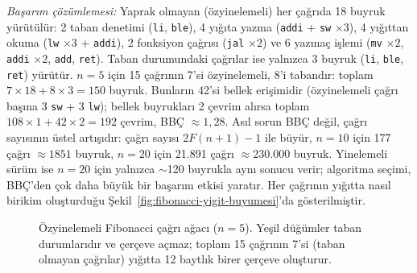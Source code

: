 \begin{ornek}[4.14]
\emph{Başarım çözümlemesi:} Yaprak olmayan (özyinelemeli) her çağrıda 18 buyruk yürütülür: 2 taban denetimi (\texttt{li}, \texttt{ble}), 4 yığıta yazma (\texttt{addi} + \texttt{sw} $\times 3$), 4 yığıttan okuma (\texttt{lw} $\times 3$ + \texttt{addi}), 2 fonksiyon çağrısı (\texttt{jal} $\times 2$) ve 6 yazmaç işlemi (\texttt{mv} $\times 2$, \texttt{addi} $\times 2$, \texttt{add}, \texttt{ret}). Taban durumundaki çağrılar ise yalnızca 3 buyruk (\texttt{li}, \texttt{ble}, \texttt{ret}) yürütür. $n = 5$ için 15 çağrının 7'si özyinelemeli, 8'i tabandır: toplam $7 \times 18 + 8 \times 3 = 150$ buyruk. Bunların 42'si bellek erişimidir (özyinelemeli çağrı başına 3 \texttt{sw} + 3 \texttt{lw}); bellek buyrukları 2 çevrim alırsa toplam $108 \times 1 + 42 \times 2 = 192$ çevrim, BBÇ $\approx 1{,}28$. Asıl sorun BBÇ değil, çağrı sayısının üstel artışıdır: çağrı sayısı $2F(n{+}1){-}1$ ile büyür, $n = 10$ için 177 çağrı $\approx 1851$ buyruk, $n = 20$ için 21.891 çağrı $\approx 230.000$ buyruk. Yinelemeli sürüm ise $n = 20$ için yalnızca $\sim$120 buyrukla aynı sonucu verir; algoritma seçimi, BBÇ'den çok daha büyük bir başarım etkisi yaratır. Her çağrının yığıtta nasıl birikim oluşturduğu Şekil~\ref{fig:fibonacci-yigit-buyumesi}'da gösterilmiştir.
\end{ornek}

\begin{figure}[H]
\centering
{}
\caption[Özyinelemeli Fibonacci çağrı ağacı]{Özyinelemeli Fibonacci çağrı ağacı ($n=5$). Yeşil düğümler taban durumlarıdır ve çerçeve açmaz; toplam 15 çağrının 7'si (taban olmayan çağrılar) yığıtta 12 baytlık birer çerçeve oluşturur.}
\label{fig:fibonacci-agac}
\end{figure}

